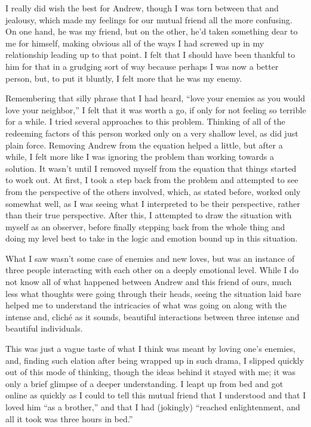 \documentclass{book}
\begin{document}
I really did wish the best for Andrew, though I was torn between that and jealousy, which made my feelings for our mutual friend all the more confusing.  On one hand, he was my friend, but on the other, he'd taken something dear to me for himself, making obvious all of the ways I had screwed up in my relationship leading up to that point.  I felt that I should have been thankful to him for that in a grudging sort of way because perhaps I was now a better person, but, to put it bluntly, I felt more that he was my enemy.

Remembering that silly phrase that I had heard, ``love your enemies as you would love your neighbor,'' I felt that it was worth a go, if only for not feeling so terrible for a while.  I tried several approaches to this problem.  Thinking of all of the redeeming factors of this person worked only on a very shallow level, as did just plain force.  Removing Andrew from the equation helped a little, but after a while, I felt more like I was ignoring the problem than working towards a solution.  It wasn't until I removed myself from the equation that things started to work out.  At first, I took a step back from the problem and attempted to see from the perspective of the others involved, which, as stated before, worked only somewhat well, as I was seeing what I interpreted to be their perspective, rather than their true perspective.  After this, I attempted to draw the situation with myself as an observer, before finally stepping back from the whole thing and doing my level best to take in the logic and emotion bound up in this situation.

What I saw wasn't some case of enemies and new loves, but was an instance of three people interacting with each other on a deeply emotional level.  While I do not know all of what happened between Andrew and this friend of ours, much less what thoughts were going through their heads, seeing the situation laid bare helped me to understand the intricacies of what was going on along with the intense and, cliché as it sounds, beautiful interactions between three intense and beautiful individuals.

This was just a vague taste of what I think was meant by loving one's enemies, and, finding such elation after being wrapped up in such drama, I slipped quickly out of this mode of thinking, though the ideas behind it stayed with me; it was only a brief glimpse of a deeper understanding.  I leapt up from bed and got online as quickly as I could to tell this mutual friend that I understood and that I loved him ``as a brother,'' and that I had (jokingly) ``reached enlightenment, and all it took was three hours in bed.''
\end{document}
